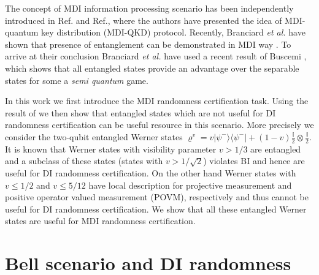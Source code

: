 \documentclass[doublecol,linenumbers]{epl2} %
\begin{document}
The concept of MDI information processing scenario has been  independently introduced in Ref.\cite{Braunstein} and Ref.\cite{Lo}, where the authors have presented the idea of MDI-quantum key distribution (MDI-QKD) protocol. Recently, Branciard \emph{et al.} have shown that presence of entanglement can be demonstrated in MDI way \cite{Branciard}. To arrive at their conclusion Branciard \emph{et al.} have used a recent result of Buscemi \cite{Buscemi}, which shows that all entangled states provide an advantage over the separable states for some a \emph{semi quantum} game.

In this work we first introduce the MDI randomness certification task. Using the result of \cite{Branciard} we then show that entangled states which are not useful for DI randomness certification can be useful resource in this scenario. More precisely we consider the two-qubit entangled Werner states $\varrho^v=v|\psi^-\rangle\langle\psi^-|+(1-v)\frac{\mathbb{I}}{2}\otimes \frac{\mathbb{I}}{2}$. It is known that Werner states with visibility parameter $v>1/3$ are entangled and a subclass of these states (states with $v>1/\sqrt{2}$) violates BI and hence are useful for DI randomness certification. On the other hand Werner states with $v\le 1/2$ and $v\le 5/12$ have local description for projective measurement and positive operator valued measurement (POVM), respectively and thus cannot be useful for DI randomness certification. We show that all these entangled Werner states are useful for MDI randomness certification.



\section{Bell scenario and  DI randomness}\label{sec2}
\end{document}
